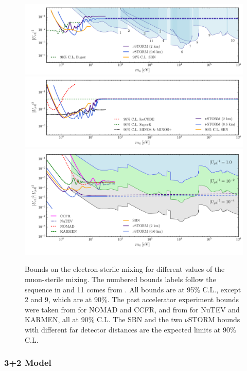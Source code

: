 \begin{figure}
\includegraphics[width=\textwidth]{figs/Bounds_edis.pdf}
\includegraphics[width=\textwidth]{figs/Bounds_dis.pdf}
\includegraphics[width=\textwidth]{figs/Bounds_UeUmuapp.pdf}
\caption{ Bounds on the electron-sterile mixing for different values of the muon-sterile mixing. The numbered bounds labels follow the sequence in \cite{Dragoun2015} and 11 comes from \cite{Abdurashitov:2017kka}. All bounds are at 95\% C.L., except 2 and 9, which are at 90\%. The past accelerator experiment bounds were taken from \cite{Astier2003} for NOMAD and CCFR, and from \cite{Avvakumov2002} for NuTEV and KARMEN, all at 90\% C.L. The SBN \cite{Cianci2017} and the two $\nu$STORM bounds with different far detector distances are the expected limits at 90\% C.L.\label{fig:bounds}}
\end{figure}


\subsubsection{3+2 Model}

